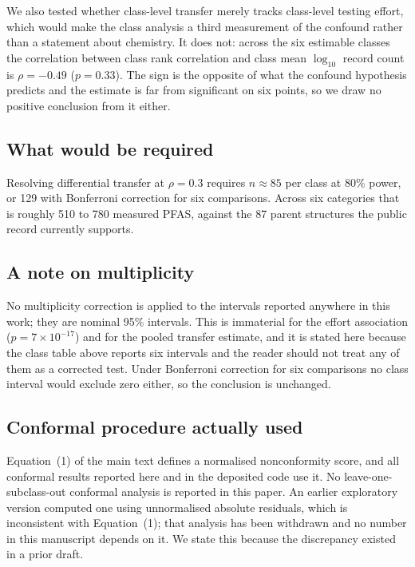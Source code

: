 \documentclass[11pt]{article}
\begin{document}
We also tested whether class-level transfer merely tracks class-level testing
effort, which would make the class analysis a third measurement of the confound
rather than a statement about chemistry. It does not: across the six estimable
classes the correlation between class rank correlation and class mean
$\log_{10}$ record count is $\rho=-0.49$ ($p=0.33$). The sign is the opposite of
what the confound hypothesis predicts and the estimate is far from significant
on six points, so we draw no positive conclusion from it either.

\subsection*{What would be required}

Resolving differential transfer at $\rho=0.3$ requires $n\approx85$ per class at
80\% power, or 129 with Bonferroni correction for six comparisons. Across six
categories that is roughly 510 to 780 measured PFAS, against the 87 parent
structures the public record currently supports.

\subsection*{A note on multiplicity}

No multiplicity correction is applied to the intervals reported anywhere in this
work; they are nominal 95\% intervals. This is immaterial for the effort
association ($p=7\times10^{-17}$) and for the pooled transfer estimate, and it
is stated here because the class table above reports six intervals and the
reader should not treat any of them as a corrected test. Under Bonferroni
correction for six comparisons no class interval would exclude zero either, so
the conclusion is unchanged.

\subsection*{Conformal procedure actually used}

Equation~(1) of the main text defines a normalised nonconformity score, and all
conformal results reported here and in the deposited code use it. No
leave-one-subclass-out conformal analysis is reported in this paper. An earlier
exploratory version computed one using unnormalised absolute residuals, which is
inconsistent with Equation~(1); that analysis has been withdrawn and no number
in this manuscript depends on it. We state this because the discrepancy existed
in a prior draft.
\end{document}

